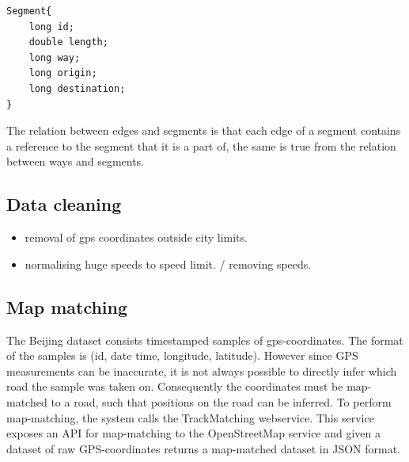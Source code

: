 \begin{lstlisting}[style=java, caption=Datastructure for a segment]
Segment{
	long id;
	double length;
	long way;
	long origin;
	long destination;
}
\end{lstlisting}

The relation between edges and segments is that each edge of a segment contains a reference to the segment that it is a part of, the same is true from the relation between ways and segments.
\subsection{Data cleaning}
\begin{itemize}
\item removal of gps coordinates outside city limits.
\item normalising huge speeds to speed limit. / removing speeds.
\end{itemize}

\subsection{Map matching}
The Beijing dataset consists timestamped samples of gps-coordinates. The format of the samples is (id, date time, longitude, latitude). However since GPS measurements can be inaccurate, it is not always possible to directly infer which road the sample was taken on. Consequently the coordinates must be map-matched to a road, such that positions on the road can be inferred. To perform map-matching, the system calls the TrackMatching webservice\cite{TrackMatching}. This service exposes an API for map-matching to the OpenStreetMap service and given a dataset of raw GPS-coordinates returns a map-matched dataset in JSON format. 
